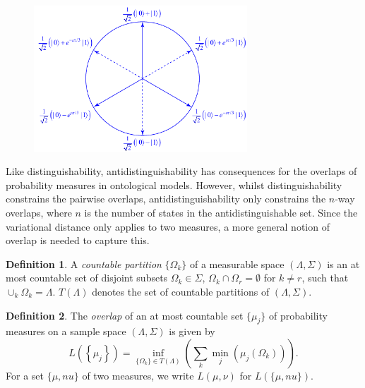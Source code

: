 \documentclass[DIV=calc,fontsize=12pt]{scrartcl} %
\theoremstyle{definition}
\newtheorem{definition}{Definition}[section]
\theoremstyle{plain}
\begin{document}
\begin{figure}[t!]
\centering
\includegraphics[width=80mm]{Fig11.pdf}
\caption{}
\end{figure}

Like distinguishability, antidistinguishability has consequences for
the overlaps of probability measures in ontological models.  However,
whilst distinguishability constrains the pairwise overlaps,
antidistinguishability only constrains the $n$-way overlaps, where $n$
is the number of states in the antidistinguishable set.  Since the
variational distance only applies to two measures, a more general
notion of overlap is needed to capture this.

\begin{definition}
\label{def:Anti:partition}
A \emph{countable partition} $\{\Omega_k\}$ of a measurable space
$(\Lambda, \Sigma)$ is an at most countable set of disjoint subsets
$\Omega_k \in \Sigma$, $\Omega_k \cap \Omega_r = \emptyset$ for $k
\neq r$, such that $\cup_k \Omega_k = \Lambda$.  $T(\Lambda)$
denotes the set of countable partitions of $(\Lambda,\Sigma)$.
\end{definition}

\begin{definition}
\label{def:Anti:overlap}
The \emph{overlap} of an at most countable set $\{\mu_j\}$ of
probability measures on a sample space $(\Lambda, \Sigma) $ is given
by
\begin{equation}
\label{eq:Anti:overlap}
L \left ( \left \{ \mu_j \right \} \right ) = \inf_{\{\Omega_k\}
\in T(\Lambda)} \left ( \sum_k \min_j \left (
\mu_j(\Omega_k) \right ) \right ).
\end{equation}
For a set $\{\mu,nu\}$ of two measures, we write $L(\mu,\nu)$ for
$L(\{\mu,nu\})$.
\end{definition}
\end{document}
